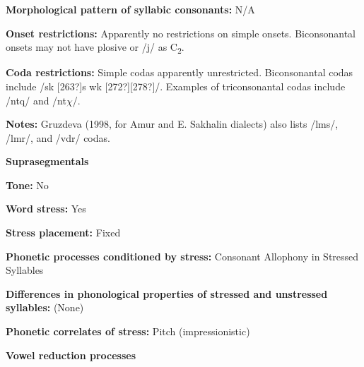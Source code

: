 \begin{styleBody}
\textbf{Morphological pattern of syllabic consonants:} N/A
\end{styleBody}

\begin{styleBody}
\textbf{Onset restrictions: }Apparently no restrictions on simple onsets. Biconsonantal onsets may not have plosive or /j/ as C\textsubscript{2}.
\end{styleBody}

\begin{styleBody}
\textbf{Coda restrictions: }Simple codas apparently unrestricted. Biconsonantal codas include /sk [263?]s wk [272?][278?]/. Examples of triconsonantal codas include /ntq/ and /nt$\chi $/.
\end{styleBody}

\begin{styleBody}
\textbf{Notes: }Gruzdeva (1998, for Amur and E. Sakhalin dialects) also lists /lms/, /lmr/, and /vdr/ codas.
\end{styleBody}

\begin{styleBody}
\textbf{Suprasegmentals}
\end{styleBody}

\begin{styleBody}
\textbf{Tone: }No
\end{styleBody}

\begin{styleBody}
\textbf{Word stress:} Yes
\end{styleBody}

\begin{styleBody}
\textbf{Stress placement:} Fixed
\end{styleBody}

\begin{styleBody}
\textbf{Phonetic processes conditioned by stress:} Consonant Allophony in Stressed Syllables
\end{styleBody}

\begin{styleBody}
\textbf{Differences in phonological properties of stressed and unstressed syllables:} (None)
\end{styleBody}

\begin{styleBody}
\textbf{Phonetic correlates of stress: }Pitch (impressionistic)
\end{styleBody}

\begin{styleBody}
\textbf{Vowel reduction processes}
\end{styleBody}

